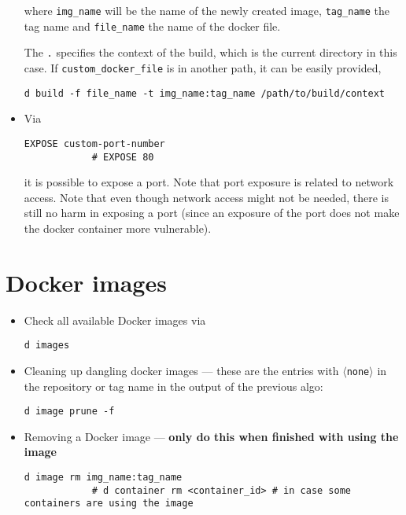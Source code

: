 \documentclass[12pt, a4paper]{scrbook}
\numberwithin{equation}{section}
\theoremstyle{definition}
\theoremstyle{definition}
\begin{document}
\begin{itemize}
		where \texttt{img\_name} will be the name of the newly created image, \texttt{tag\_name} the tag name and \texttt{file\_name} the name of the docker file. 
		
		The \texttt{.} specifies the context of the build, which is the current directory in this case. If \texttt{custom_docker_file} is in another path, it can be easily provided,
		
		\begin{lstlisting}[style=mystylebash, xleftmargin=\parindent]
			d build -f file_name -t img_name:tag_name /path/to/build/context
		\end{lstlisting}
		
		\item Via 
		
		\begin{lstlisting}[style=mystylebash, label=alg:docker__expose_port, xleftmargin=\parindent]
			EXPOSE custom-port-number
			# EXPOSE 80
		\end{lstlisting}
		
		it is possible to expose a port. Note that port exposure is related to network access. Note that even though network access might not be needed, there is still no harm in exposing a port (since an exposure of the port does not make the docker container more vulnerable).
		
	\end{itemize} 
	
	\section{Docker images}
	
	\begin{itemize}
		
		\item Check all available Docker images via
		
		\begin{lstlisting}[style=mystylebash, label=alg:docker__check_avail_imgs, xleftmargin=\parindent]
			d images
		\end{lstlisting}
		
		\item Cleaning up dangling docker images --- these are the entries with $\langle$\texttt{none}$\rangle$ in the repository or tag name in the output of the previous algo:
		
		\begin{lstlisting}[style=mystylebash, label=alg:docker_rm__dangling, xleftmargin=\parindent]
			d image prune -f
		\end{lstlisting}
		
		\item Removing a Docker image --- \textbf{only do this when finished with using the image}
		
		\begin{lstlisting}[style=mystylebash, label=alg:docker_remove, xleftmargin=\parindent]
			d image rm img_name:tag_name
			# d container rm <container_id> # in case some containers are using the image
		\end{lstlisting}
		
	\end{itemize}
	
\end{document}
